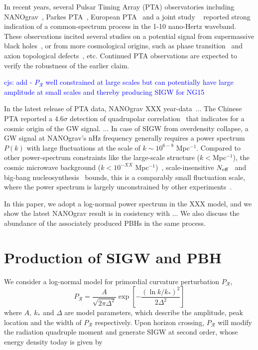 \documentclass[aps, 10pt, preprintnumbers,prd, amsmath,amssymb,twocolumn,notitlepage]{revtex4} %
\newcommand{\neff}{N_{\rm{eff}}}
\newcommand{\ps}{P_{\mathcal{R}}}
\newcommand{\ck}[1]{\textcolor{blue}{#1}}
\newcommand{\be}{\begin{equation}}
\newcommand{\ee}{\end{equation}}
\begin{document}
In recent years, several Pulsar Timing Array (PTA) observatories including NANOgrav~\cite{NANOGrav:2020bcs}, Parkes PTA~\cite{Goncharov:2021oub}, European PTA~\cite{Chen:2021rqp} and a joint study ~\cite{Antoniadis:2022pcn} reported strong indication of a common-spectrum process in the 1-10 nano-Hertz waveband. 
These observations incited several studies on a potential signal from supermassive black holes~\cite{Middleton:2020asl}, or from more cosmological origins, such as phase transition~\cite{Bian:2020urb,NANOGrav:2021flc,Xue:2021gyq,Wang:2022wwj} and axion topological defects~\cite{Wang:2022rjz,Ferreira:2022zzo}, etc. Continued PTA observations are expected to verify the robustness of the earlier claim. 

\ck{cjs: add - $\ps$ well constrained at large scales but can potentially have large amplitude at small scales and thereby producing SIGW for NG15}

In the latest release of PTA data, NANOgrav XXX year-data~\cite{}... The Chinese PTA reported a $4.6\sigma$ detection of quadrupolar correlation~\cite{Xu_2023} that indicates for a cosmic origin of the GW signal. ... In case of SIGW from overdensity collapse, a GW signal at NANOgrav's nHz frequency generally requires a power spectrum $P(k)$ with large fluctuations at the scale of $k\sim 10^{6-8}$ Mpc$^{-1}$. Compared to other power-spectrum constraints like the large-scale structure ($k<$Mpc$^{-1}$), the cosmic microwave background ($k< 10^{-XX}$ Mpc$^{-1}$)~\cite{Hunt:2015iua}, scale-insensitive $N_{\rm eff}$~\cite{PLK2015,Cang:2022jyc} and big-bang nucleosynthesis~\cite{Kohri:2018awv,Inomata:2018epa} bounds, this is a comparably small  fluctuation scale, where the power spectrum is largely unconstrained by other experiments~\cite{}. 

In this paper, we adopt a log-normal power spectrum in the XXX model, and we show the latest NANOgrav result is in cosistency with ... We also discuss the abundance of the associately produced PBHs in the same process.




\section{Production of SIGW and PBH}
We consider a log-normal model for primordial curvature perturbation $\ps$,
\be
\ps
=
\frac{A}{\sqrt{2 \pi \Delta^2}}
\exp
\left[
-\frac{(\ln k/k_*)^2}{2\Delta^2}
\right]
\ee
where $A,\ k_*$ and $\Delta$ are model parameters,
which describe the amplitude,
peak location and the width of $\ps$ respectively.
Upon horizon crossing,
$\ps$ will modify the radiation quadruple moment and generate SIGW at second order,
whose energy density today is given by~\cite{Cang:2022jyc,Ando:2018qdb,Kohri:2018awv,Inomata:2018epa}
\end{document}
